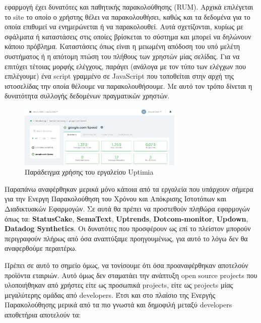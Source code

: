 \begin{itemize}
	      εφαρμογή έχει δυνατότες και παθητικής παρακολούθησης (RUM). Αρχικά επιλέγεται το site το οποίο ο χρήστης θέλει να παρακολουθήσει, καθώς και τα δεδομένα για το οποία επιθυμεί να ενημερώνεται ή να παρακολουθεί.
		  Αυτά σχετίζονται, κυρίως με σφάλματα ή καταστάσεις στις οποίες βρίσκεται το σύστημα και μπορεί να δηλώνουν κάποιο πρόβλημα.
		  Καταστάσεις όπως είναι η μειωμένη απόδοση του υπό μελέτη συστήματος ή η απότομη πτώση του πλήθους των χρηστών μίας σελίδας.
	      Για να επιτύχει τέτοιας μορφής ελέγχους, παράγει (ανάλογα με τον τύπο των ελέγχων που επιλέγουμε)
	      ένα script γραμμένο σε JavaScript που τοποθείται στην αρχή της ιστοσελίδας την οποία θέλουμε να παρακολουθήσουμε.
	      Με αυτό τον τρόπο δίνεται η δυνατότητα συλλογής δεδομένων πραγματικών χρηστών.
	      \begin{figure}[!ht]
		      \centering
		      \includegraphics[width=0.7\textwidth]{./images/chapter3/uptimia.png}
		      \caption[Παράδειγμα χρήσης του εργαλείου Uptimia]{Παράδειγμα χρήσης του εργαλείου Uptimia}
		      \label{fig:uptimia}
	      \end{figure}
\end{itemize}

\break

Παραπάνω αναφέρθηκαν μερικά μόνο κάποια από τα εργαλεία που υπάρχουν σήμερα για την Ενεργη Παρακολούθηση του Χρόνου
και Απόκρισης Ιστοτόπων και Διαδικτυακών Εφαρμογών. Σε αυτά θα πρέπει να προστεθούν πληθώρα εφαρμογών όπως τα:
\textbf{StatusCake}, \textbf{SemaText}, \textbf{Uptrends}, \textbf{Dotcom-monitor}, \textbf{Updown}, \textbf{Datadog Synthetics}.
Οι δυνατότες που προσφέρουν ως επί το πλείστον μπορούν περιγραφούν πλήρως από όσα αναπτύξαμε προηγουμένως, για αυτό το λόγω δεν θα αναφερθούμε περαιτέρω.

Πρέπει σε αυτό το σημείο όμως, να τονίσουμε ότι όσα προαναφέρθηκαν αποτελούν προϊόντα εταιριών.
Αυτό όμως δεν σταματάει την ανάπτυξη open source projects που υλοποιήθηκαν από χρήστες είτε ως προσωπικά projects, είτε
ως projects μίας μεγαλύτερης ομάδας από developers. Έτσι και στο πλαίσιο της Ενεργής Παρακολούθησης μερικά από τα πιο
γνωστά και δημοφιλή μεταξύ developers αποθετήρια αποτελούν τα:

